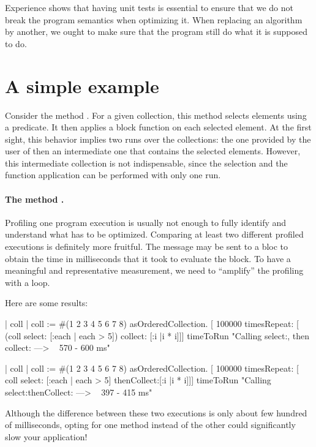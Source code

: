 \documentclass[a4paper,10pt,twoside]{book}
\begin{document}
Experience shows that having unit tests is essential to ensure that we do not break the program semantics when optimizing it. When replacing an algorithm by another, we ought to make sure that the program still do what it is supposed to do.


\section{A simple example}

Consider the method . For a given collection, this method selects elements using a predicate. It then applies a block function on each selected element. At the first sight, this behavior implies two runs over the collections: the one provided by the user of  then an intermediate one that contains the selected elements. However, this intermediate collection is not indispensable, since the selection and the function application can be performed with only one run.

\paragraph{The method .} Profiling one program execution is usually not enough to fully identify and understand what has to be optimized. Comparing at least two different profiled executions is definitely more fruitful. The message  may be sent to a bloc to obtain the time in milliseconds that it took to evaluate the block. To have a meaningful and representative measurement, we need to ``amplify'' the profiling with a loop.

Here are some results:
\begin{code}{}
	| coll |
	coll := #(1 2 3 4 5 6 7 8) asOrderedCollection. 
	[ 100000 timesRepeat: [ (coll select: [:each | each > 5]) collect: [:i |i * i]]] timeToRun
	"Calling select:, then collect: ---> ~ 570 - 600 ms"

	| coll |
	coll := #(1 2 3 4 5 6 7 8) asOrderedCollection. 
	[ 100000 timesRepeat: [ coll select: [:each | each > 5] thenCollect:[:i |i * i]]] timeToRun
	"Calling select:thenCollect: ---> ~ 397 - 415 ms"
\end{code}

Although the difference between these two executions is only about few hundred of milliseconds, opting for one method instead of the other could significantly slow your application!
\end{document}
